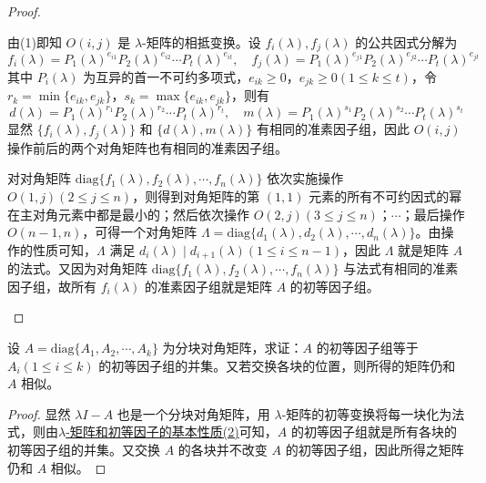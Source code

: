 \documentclass[../../main.tex]{subfiles}%
\begin{document}
\begin{proof}
\begin{enumerate}[(1)]
由(1)即知 \(O(i,j)\) 是 \(\lambda\)-矩阵的相抵变换。设 \(f_i(\lambda),f_j(\lambda)\) 的公共因式分解为
\[
f_i(\lambda)=P_1(\lambda)^{e_{i1}}P_2(\lambda)^{e_{i2}}\cdots P_t(\lambda)^{e_{it}}, \quad f_j(\lambda)=P_1(\lambda)^{e_{j1}}P_2(\lambda)^{e_{j2}}\cdots P_t(\lambda)^{e_{jt}}
\]
其中 \(P_i(\lambda)\) 为互异的首一不可约多项式，\(e_{ik}\geqslant 0\)，\(e_{jk}\geqslant 0(1\leqslant  k\leqslant  t)\)，令 \(r_k = \min\{e_{ik},e_{jk}\}\)，\(s_k = \max\{e_{ik},e_{jk}\}\)，则有
\[
d(\lambda)=P_1(\lambda)^{r_1}P_2(\lambda)^{r_2}\cdots P_t(\lambda)^{r_t}, \quad m(\lambda)=P_1(\lambda)^{s_1}P_2(\lambda)^{s_2}\cdots P_t(\lambda)^{s_t}
\]
显然 \(\{f_i(\lambda),f_j(\lambda)\}\) 和 \(\{d(\lambda),m(\lambda)\}\) 有相同的准素因子组，因此 \(O(i,j)\) 操作前后的两个对角矩阵也有相同的准素因子组。

对对角矩阵 \(\mathrm{diag}\{f_1(\lambda),f_2(\lambda),\cdots,f_n(\lambda)\}\) 依次实施操作 \(O(1,j)(2\leqslant  j\leqslant  n)\)，则得到对角矩阵的第 \((1,1)\) 元素的所有不可约因式的幂在主对角元素中都是最小的；然后依次操作 \(O(2,j)(3\leqslant  j\leqslant  n)\)；\(\cdots\)；最后操作 \(O(n - 1,n)\)，可得一个对角矩阵 \(\varLambda=\mathrm{diag}\{d_1(\lambda),d_2(\lambda),\cdots,d_n(\lambda)\}\)。由操作的性质可知，\(\varLambda\) 满足 \(d_i(\lambda)\mid d_{i + 1}(\lambda)(1\leqslant  i\leqslant  n - 1)\)，因此 \(\varLambda\) 就是矩阵 \(A\) 的法式。又因为对角矩阵 \(\mathrm{diag}\{f_1(\lambda),f_2(\lambda),\cdots,f_n(\lambda)\}\) 与法式有相同的准素因子组，故所有 \(f_i(\lambda)\) 的准素因子组就是矩阵 \(A\) 的初等因子组。
\end{enumerate}

\end{proof}

\begin{proposition}
设 \(A = \mathrm{diag}\{A_1,A_2,\cdots,A_k\}\) 为分块对角矩阵，求证：\(A\) 的初等因子组等于 \(A_i(1\leqslant  i\leqslant  k)\) 的初等因子组的并集。又若交换各块的位置，则所得的矩阵仍和 \(A\) 相似。
\end{proposition}
\begin{proof}

显然 \(\lambda I - A\) 也是一个分块对角矩阵，用 \(\lambda\)-矩阵的初等变换将每一块化为法式，则由\hyperref[theorem:lambda-矩阵和初等因子的基本性质]{$\lambda$-矩阵和初等因子的基本性质(2)}可知，\(A\) 的初等因子组就是所有各块的初等因子组的并集。又交换 \(A\) 的各块并不改变 \(A\) 的初等因子组，因此所得之矩阵仍和 \(A\) 相似。

\end{proof}
\end{document}
